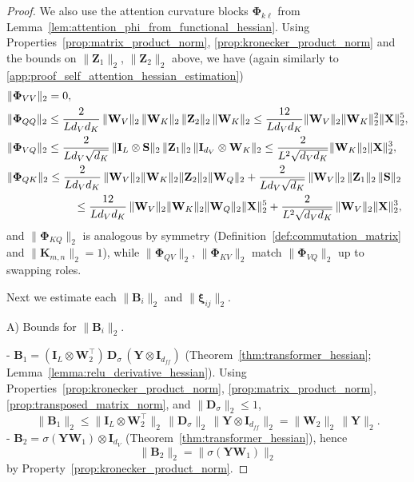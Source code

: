 \documentclass{article}
\begin{document}
\begin{proof}
We also use the attention curvature blocks $\boldsymbol{\Phi}_{k\ell}$ from Lemma~\ref{lem:attention_phi_from_functional_hessian}. Using Properties~\ref{prop:matrix_product_norm}, \ref{prop:kronecker_product_norm} and the bounds on $\|\mathbf{Z}_1\|_2$, $\|\mathbf{Z}_2\|_2$ above, we have (again similarly to \ref{app:proof_self_attention_hessian_estimation})
\begin{align*}
&\|\boldsymbol{\Phi}_{VV}\|_2 = 0,\\
&\|\boldsymbol{\Phi}_{QQ}\|_2
\le \frac{2}{L d_V d_K}\, \|\mathbf{W}_V\|_2\, \|\mathbf{W}_K\|_2\, \|\mathbf{Z}_2\|_2 \, \|\mathbf{W}_K\|_2
\le \frac{12}{L d_V d_K} \|\mathbf{W}_V\|_2 \|\mathbf{W}_K\|_2^2 \|\mathbf{X}\|_2^5,\\
&\|\boldsymbol{\Phi}_{VQ}\|_2
\le \frac{2}{L d_V \sqrt{d_K}}\, \|\mathbf{I}_L \otimes \mathbf{S}\|_2 \, \|\mathbf{Z}_1\|_2 \, \|\mathbf{I}_{d_V} \otimes \mathbf{W}_K\|_2
\le \frac{2}{L^2 \sqrt{d_V d_K}} \|\mathbf{W}_K\|_2 \|\mathbf{X}\|_2^3,\\
&\|\boldsymbol{\Phi}_{QK}\|_2
\le \frac{2}{L d_V d_K}\, \|\mathbf{W}_V\|_2 \|\mathbf{W}_K\|_2 \|\mathbf{Z}_2\|_2 \|\mathbf{W}_Q\|_2
+ \frac{2}{L d_V \sqrt{d_K}}\, \|\mathbf{W}_V\|_2 \, \|\mathbf{Z}_1\|_2 \, \|\mathbf{S}\|_2 \\
&\hspace{2.1cm}\le \frac{12}{L d_V d_K}\, \|\mathbf{W}_V\|_2 \|\mathbf{W}_K\|_2 \|\mathbf{W}_Q\|_2 \|\mathbf{X}\|_2^5
+ \frac{2}{L^2 \sqrt{d_V d_K}}\, \|\mathbf{W}_V\|_2 \|\mathbf{X}\|_2^3,
\end{align*}
and $\|\boldsymbol{\Phi}_{KQ}\|_2$ is analogous by symmetry (Definition~\ref{def:commutation_matrix} and $\|\mathbf{K}_{m,n}\|_2=1$), while $\|\boldsymbol{\Phi}_{QV}\|_2$, $\|\boldsymbol{\Phi}_{KV}\|_2$ match $\|\boldsymbol{\Phi}_{VQ}\|_2$ up to swapping roles.

Next we estimate each $\|\mathbf{B}_i\|_2$ and $\|\boldsymbol{\xi}_{ij}\|_2$.

A) Bounds for $\|\mathbf{B}_i\|_2$.

- $\mathbf{B}_1 = (\mathbf{I}_L \otimes \mathbf{W}_2^\top)\, \mathbf{D}_\sigma\, (\mathbf{Y} \otimes \mathbf{I}_{d_{ff}})$ (Theorem~\ref{thm:transformer_hessian}; Lemma~\ref{lemma:relu_derivative_hessian}). Using Properties~\ref{prop:kronecker_product_norm}, \ref{prop:matrix_product_norm}, \ref{prop:transposed_matrix_norm}, and $\|\mathbf{D}_\sigma\|_2 \le 1$,
\begin{equation}\label{eq:B1_norm}
\|\mathbf{B}_1\|_2 \le \|\mathbf{I}_L \otimes \mathbf{W}_2^\top\|_2 \,\|\mathbf{D}_\sigma\|_2 \,\|\mathbf{Y} \otimes \mathbf{I}_{d_{ff}}\|_2
= \|\mathbf{W}_2\|_2 \,\|\mathbf{Y}\|_2.
\end{equation}
- $\mathbf{B}_2 = \sigma(\mathbf{Y}\mathbf{W}_1) \otimes \mathbf{I}_{d_V}$ (Theorem~\ref{thm:transformer_hessian}), hence
\begin{equation}\label{eq:B2_norm}
\|\mathbf{B}_2\|_2 = \|\sigma(\mathbf{Y}\mathbf{W}_1)\|_2
\end{equation}
by Property~\ref{prop:kronecker_product_norm}.


\end{proof}
\end{document}
